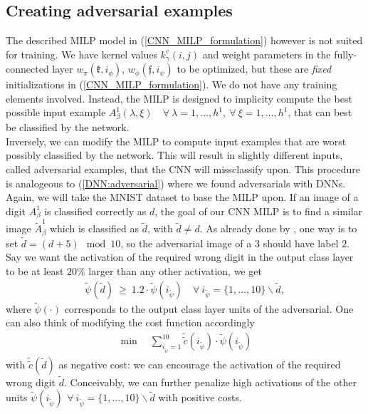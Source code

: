 \documentclass{article}
\begin{document}
{\subsection{Creating adversarial examples}
The described MILP model in (\ref{CNN_MILP_formulation}) however is not suited for training. We have kernel values $k_\gamma^c(i,j)$ and weight parameters in the fully-connected layer $w_\pi(\mathfrak{k}, i_\phi)$, $w_\phi(\mathfrak{f}, i_\psi)$ to be optimized, but these are \textit{fixed} initializations in (\ref{CNN_MILP_formulation}). We do not have any training elements involved. Instead, the MILP is designed to implicity compute the best possible input example $A_\beta^1(\lambda, \xi) \quad \forall \ \lambda=1, \ldots, h^1, \ \forall \ \xi =1, \ldots, h^1$, that can best be classified by the network.\\
Inversely, we can modify the MILP to compute input examples that are worst possibly classified by the network. This will result in slightly different inputs, called adversarial examples, that the CNN will missclassify upon. This procedure is analogeous to (\ref{DNN:adversarial}) where we found adversarials with DNNs. Again, we will take the MNIST dataset to base the MILP upon. If an image of a digit $A_\beta^1$ is classified correctly as $d$, the goal of our CNN MILP is to find a similar image $\tilde{A}_\beta^1$ which is classified as $\tilde{d}$, with $\tilde{d}\neq d$. As already done by \cite{fischetti17}, one way is to set $\tilde{d} = (d+5) \mod 10$, so the adversarial image of a $3$ should have label $2$.\\
Say we want the activation of the required wrong digit in the output class layer to be at least $20\%$ larger than any other activation, we get
\begin{align} 
\tilde{\psi}(\tilde{d}) \ \geq \ 1.2 \cdot \tilde{\psi}(i_{\tilde{\psi}}) \quad \forall \ i_{\tilde{\psi}}=\{1,\ldots ,10 \} \backslash \tilde{d}, \label{20activation:cnn_144}
\end{align}
where $\tilde{\psi}(\cdot)$ corresponds to the output class layer units of the adversarial.
One can also think of modifying the cost function accordingly
\begin{align}
\min \quad \sum_{i_{\tilde{\psi}}=1}^{10} \tilde{\tilde{c}}(i_{\tilde{\psi}}) \cdot \tilde{\psi}(i_{\tilde{\psi}}) \label{cost_fkt_cnn_adversarial}
\end{align}
with $\tilde{\tilde{c}}(\tilde{d})$ as negative cost: we can encourage the activation of the required wrong digit $\tilde{d}$. Conceivably, we can further penalize high activations of the other units $\tilde{\psi}(i_{\tilde{\psi}}) \ \, \forall \ i_{\tilde{\psi}}=\{1, \ldots, 10 \} \backslash \tilde{d}$ with positive costs.\\
}
\end{document}

